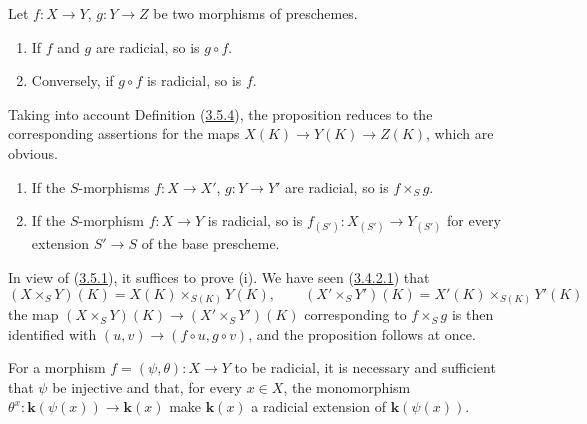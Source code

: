 \begin{proposition}[3.5.6]
\label{I.3.5.6}
Let $f:X\to Y$, $g:Y\to Z$ be two morphisms of preschemes.
\begin{enumerate}
  \item[(i)] If $f$ and $g$ are radicial, so is $g\circ f$.
  \item[(ii)] Conversely, if $g\circ f$ is radicial, so is
  $f$.
\end{enumerate}
\end{proposition}

Taking into account Definition (\hyperref[I.3.5.4]{3.5.4}), the proposition
reduces to the corresponding assertions for the maps
$X(K)\to Y(K)\to Z(K)$, which are obvious.

\begin{proposition}[3.5.7]
\label{I.3.5.7}
\begin{enumerate}
  \item[(i)] If the $S$-morphisms $f:X\to X'$, $g:Y\to Y'$ are radicial,
  so is $f\times_S g$.
  \item[(ii)] If the $S$-morphism $f:X\to Y$ is radicial, so is
  $f_{(S')}:X_{(S')}\to Y_{(S')}$ for every extension $S'\to S$ of the
  base prescheme.
\end{enumerate}
\end{proposition}

In view of (\hyperref[I.3.5.1]{3.5.1}), it suffices to prove (i). We have
seen (\hyperref[I.3.4.2.1]{3.4.2.1}) that
\label{I.3.5.7.field-valued-product}
\[
  (X\times_S Y)(K)=X(K)\times_{S(K)}Y(K),\qquad
  (X'\times_S Y')(K)=X'(K)\times_{S(K)}Y'(K)
\]
the map $(X\times_S Y)(K)\to(X'\times_S Y')(K)$ corresponding to
$f\times_S g$ is then identified with $(u,v)\to(f\circ u,g\circ v)$, and
the proposition follows at once.

\begin{proposition}[3.5.8]
\label{I.3.5.8}
For a morphism $f=(\psi,\theta):X\to Y$ to be radicial, it is necessary and
sufficient that $\psi$ be injective and that, for every $x\in X$, the
monomorphism $\theta^x:\boldsymbol{k}(\psi(x))\to\boldsymbol{k}(x)$ make $\boldsymbol{k}(x)$ a radicial extension of
$\boldsymbol{k}(\psi(x))$.
\end{proposition}

